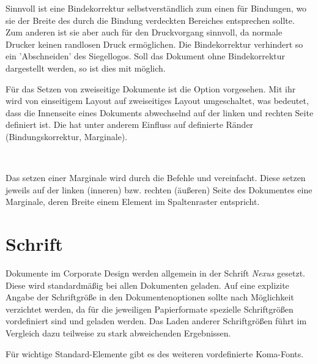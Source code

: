\documentclass[a4paper,11pt]{tubsreprt}
\begin{document}
Sinnvoll ist eine Bindekorrektur selbstverständlich zum einen für Bindungen,
wo sie der Breite des durch die Bindung verdeckten Bereiches entsprechen sollte.
Zum anderen ist sie aber auch für den Druckvorgang sinnvoll, da normale Drucker
keinen randlosen Druck ermöglichen. Die Bindekorrektur verhindert so \zB ein 'Abschneiden' des Siegellogos.
Soll das Dokument ohne Bindekorrektur dargestellt werden, so ist dies
mit  möglich.

\begin{Declaration}
\end{Declaration}

Für das Setzen von zweiseitige Dokumente ist die Option 
vorgesehen. Mit ihr wird von einseitigem Layout auf zweiseitiges Layout
umgeschaltet, was bedeutet, dass die Innenseite eines Dokuments abwechselnd
auf der linken und rechten Seite definiert ist. Die hat unter anderem Einfluss
auf definierte Ränder (Bindungskorrektur, Marginale).


\begin{Declaration}
  \\
\end{Declaration}

Das setzen einer Marginale wird durch die Befehle  und
 vereinfacht. Diese setzen jeweils auf der linken (inneren)
bzw. rechten (äußeren) Seite des Dokumentes eine Marginale, deren Breite
einem Element im Spaltenraster entspricht.


\section{Schrift}

Dokumente im Corporate Design werden allgemein in der Schrift \emph{Nexus}
gesetzt.
Diese wird standardmäßig bei allen Dokumenten geladen. Auf eine explizite
Angabe der Schriftgröße in den Dokumentenoptionen sollte nach Möglichkeit
verzichtet werden, da für die jeweiligen Papierformate spezielle
Schriftgrößen vordefiniert sind und geladen werden.
Das Laden anderer Schriftgrößen führt im Vergleich dazu teilweise zu stark abweichenden Ergebnissen.

Für wichtige Standard-Elemente gibt es des weiteren vordefinierte Koma-Fonts.


\begin{desctable}
\end{desctable}
\end{document}
